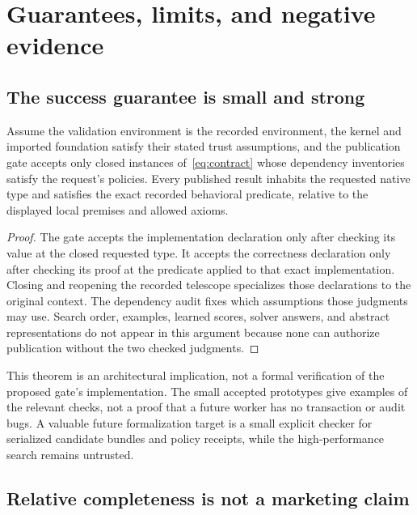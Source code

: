 \section{Guarantees, limits, and negative evidence}
\label{sec:guarantees}

\subsection{The success guarantee is small and strong}

\begin{theorem}\label{thm:sound}
Assume the validation environment is the recorded environment, the kernel and imported foundation satisfy their stated trust assumptions, and the publication gate accepts only closed instances of~\eqref{eq:contract} whose dependency inventories satisfy the request's policies. Every published  result inhabits the requested native type and satisfies the exact recorded behavioral predicate, relative to the displayed local premises and allowed axioms.
\end{theorem}
\begin{proof}
The gate accepts the implementation declaration only after checking its value at the closed requested type. It accepts the correctness declaration only after checking its proof at the predicate applied to that exact implementation. Closing and reopening the recorded telescope specializes those declarations to the original context. The dependency audit fixes which assumptions those judgments may use. Search order, examples, learned scores, solver answers, and abstract representations do not appear in this argument because none can authorize publication without the two checked judgments.
\end{proof}

This theorem is an architectural implication, not a formal verification of the proposed gate's implementation. The small accepted prototypes give examples of the relevant checks, not a proof that a future worker has no transaction or audit bugs. A valuable future formalization target is a small explicit checker for serialized candidate bundles and policy receipts, while the high-performance search remains untrusted.

\subsection{Relative completeness is not a marketing claim}

